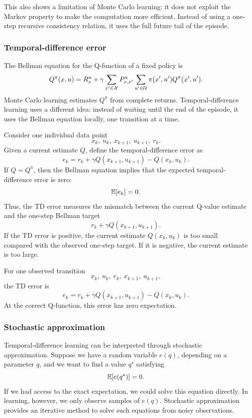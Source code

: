 This also shows a limitation of Monte Carlo learning: it does not exploit the Markov property
to make the computation more efficient. Instead of using a one-step recursive consistency
relation, it uses the full future tail of the episode.

\subsubsection{Temporal-difference error}

The Bellman equation for the Q-function of a fixed policy is
\[
Q^\pi(x,u)
=
R_x^u
+
\gamma\sum_{x'\in\mathcal{X}}P^u_{x,x'}
\sum_{u'\in\mathcal{U}}\pi(x',u')Q^\pi(x',u').
\]
Monte Carlo learning estimates \(Q^\pi\) from complete returns. Temporal-difference learning
uses a different idea: instead of waiting until the end of the episode, it uses the Bellman
equation locally, one transition at a time.

Consider one individual data point
\[
x_k,\ u_k,\ x_{k+1},\ u_{k+1},\ r_k.
\]
Given a current estimate \(Q\), define the temporal-difference error as
\[
e_k
=
r_k+\gamma Q(x_{k+1},u_{k+1})-Q(x_k,u_k).
\]
If \(Q=Q^\pi\), then the Bellman equation implies that the expected temporal-difference error
is zero:
\[
\mathbb{E}[e_k]=0.
\]
Thus, the TD error measures the mismatch between the current Q-value estimate and the
one-step Bellman target
\[
r_k+\gamma Q(x_{k+1},u_{k+1}).
\]
If the TD error is positive, the current estimate \(Q(x_k,u_k)\) is too small compared with the
observed one-step target. If it is negative, the current estimate is too large.

\begin{theorembox}
For one observed transition
\[
x_k,\ u_k,\ r_k,\ x_{k+1},\ u_{k+1},
\]
the TD error is
\[
e_k
=
r_k+\gamma Q(x_{k+1},u_{k+1})-Q(x_k,u_k).
\]
At the correct Q-function, this error has zero expectation.
\end{theorembox}

\subsubsection{Stochastic approximation}

Temporal-difference learning can be interpreted through stochastic approximation. Suppose we
have a random variable \(e(q)\), depending on a parameter \(q\), and we want to find a value
\(q^\star\) satisfying
\[
\mathbb{E}[e(q^\star)]=0.
\]
If we had access to the exact expectation, we could solve this equation directly. In learning,
however, we only observe samples of \(e(q)\). Stochastic approximation provides an iterative
method to solve such equations from noisy observations.

